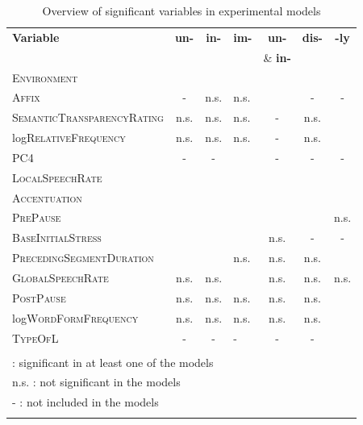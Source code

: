 \begin{table}
	\caption{Overview of significant variables in experimental models}
	\label{tbl: Overview of complete results in the experimental study}
	
	
		\begin{tabular} {lcclccc}
			
			\lsptoprule
			\textbf{Variable} & \textbf{un-} & \textbf{in-} & \textbf{im-}&\textbf{un-} &\textbf{dis-}& \textbf{-ly}\\
			& & & &\& \textbf{in-}  && \\
			\midrule			
			\textsc{Environment}& \checkmark & \checkmark  & \checkmark  &\checkmark   &  \checkmark & \checkmark \\ 
			\textsc{Affix }&- &n.s. & n.s. & \checkmark  &- & -\\ 
			\textsc{SemanticTransparencyRating}&n.s.& n.s.&n.s.  & - &n.s. &\checkmark  \\
			log\textsc{RelativeFrequency}&n.s.& n.s.&n.s.  & - &n.s. &\checkmark  \\
					\textsc{PC4}&-& -&\checkmark & - &- &-  \\	
			\textsc{LocalSpeechRate}&\checkmark & \checkmark & \checkmark & \checkmark  &\checkmark  & \checkmark \\	
			\textsc{Accentuation}&\checkmark &  \checkmark & \checkmark &\checkmark  & \checkmark & \checkmark \\		
			\textsc{PrePause}&\checkmark &\checkmark& \checkmark&\checkmark  & \checkmark & n.s.\\
			\textsc{BaseInitialStress}&\checkmark& \checkmark &\checkmark  & n.s. &- &-\\
			
			\textsc{PrecedingSegmentDuration}&\checkmark &\checkmark & n.s. & n.s.&n.s.  & \checkmark \\

			\textsc{GlobalSpeechRate}&n.s.& n.s. &\checkmark  &n.s. &  n.s. & n.s.\\	

			\textsc{PostPause}&n.s. & n.s.& n.s. &n.s.  & n.s. &\checkmark \\		
			log\textsc{WordFormFrequency}&n.s. & n.s.& n.s. &n.s.  & n.s. &\checkmark \\		
						\textsc{TypeOfL}&- & -& -&- & -&\checkmark \\
			\midrule\\
			
			\multicolumn{6}{l}{\small \checkmark \hspace*{0.2cm}: significant in at least one of the models} \\			
			\multicolumn{6}{l}{\small n.s. : not significant in the models} \\			
			\multicolumn{6}{l}{\small - \hspace*{0.45cm}: not included in the models} \\			
			\lspbottomrule
		\end{tabular}
	
	
	
	
\end{table}




